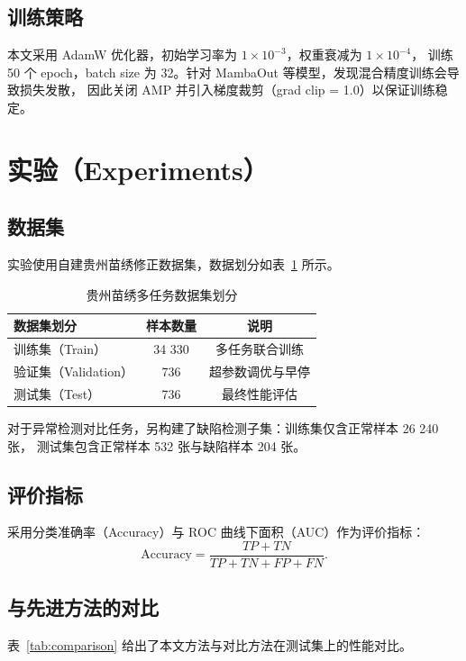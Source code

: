 \documentclass[12pt,a4paper]{article}
\begin{document}
\subsection{训练策略}
本文采用 AdamW 优化器，初始学习率为 $1\times 10^{-3}$，权重衰减为 $1\times 10^{-4}$，
训练 50 个 epoch，batch size 为 32。针对 MambaOut 等模型，发现混合精度训练会导致损失发散，
因此关闭 AMP 并引入梯度裁剪（grad clip = 1.0）以保证训练稳定。

\section{实验（Experiments）}

\subsection{数据集}
实验使用自建贵州苗绣修正数据集，数据划分如表~\ref{tab:dataset} 所示。

\begin{table}[htbp]
\centering
\caption{贵州苗绣多任务数据集划分}
\label{tab:dataset}
\begin{tabular}{lcc}
\toprule
数据集划分 & 样本数量 & 说明 \\
\midrule
训练集（Train） & 34 330 & 多任务联合训练 \\
验证集（Validation） & 736 & 超参数调优与早停 \\
测试集（Test） & 736 & 最终性能评估 \\
\bottomrule
\end{tabular}
\end{table}

对于异常检测对比任务，另构建了缺陷检测子集：训练集仅含正常样本 26 240 张，
测试集包含正常样本 532 张与缺陷样本 204 张。

\subsection{评价指标}
采用分类准确率（Accuracy）与 ROC 曲线下面积（AUC）作为评价指标：
\begin{equation}
    \text{Accuracy} = \frac{TP+TN}{TP+TN+FP+FN}.
\end{equation}

\subsection{与先进方法的对比}
表~\ref{tab:comparison} 给出了本文方法与对比方法在测试集上的性能对比。
\end{document}
